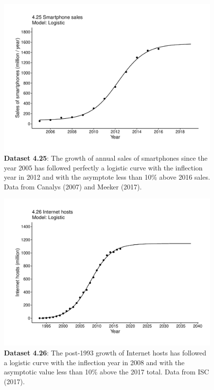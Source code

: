 \documentclass[aps,rmp,preprint,superscriptaddress,10pt,onecolumn]{article}
\begin{document}
\clearpage
\begin{figure}[h]
\includegraphics[width=\textwidth]{output/figs-ggplot/4.25.pdf}
\caption{\textbf{Dataset 4.25}: The growth of annual sales of smartphones since the year 2005 has followed perfectly a logistic curve with the inflection year in 2012 and with the asymptote less than 10\% above 2016 sales. Data from Canalys (2007) and Meeker (2017).}
\end{figure}
	
\clearpage
\begin{figure}[h]
\includegraphics[width=\textwidth]{output/figs-ggplot/4.26.pdf}
\caption{\textbf{Dataset 4.26}: The post-1993 growth of Internet hosts has followed a logistic curve with the inflection year in 2008 and with the asymptotic value less than 10\% above the 2017 total. Data from ISC (2017). }
\end{figure}
	
\end{document}

